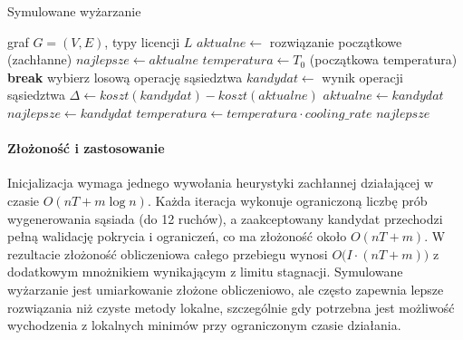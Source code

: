 \begin{algorithm}[H]
  \caption{Symulowane wyżarzanie}
  \label{alg:sa}
  \begin{algorithmic}[1]
    \Require graf $G=(V,E)$, typy licencji $ L$
    \State $aktualne \gets$ rozwiązanie początkowe (zachłanne)
    \State $najlepsze \gets aktualne$
    \State $temperatura \gets T_0$ (początkowa temperatura)
     \textbf{break} \EndIf
    \State wybierz losową operację sąsiedztwa
    \State $kandydat \gets$ wynik operacji sąsiedztwa
    \State $\Delta \gets koszt(kandydat) - koszt(aktualne)$
    \State $aktualne \gets kandydat$
    \State $najlepsze \gets kandydat$
    \EndIf
    \EndIf
    \State $temperatura \gets temperatura \cdot cooling\_rate$
    \EndFor
    \State \Return $najlepsze$
  \end{algorithmic}
\end{algorithm}

\paragraph{Złożoność i zastosowanie}
Inicjalizacja wymaga jednego wywołania heurystyki zachłannej działającej w czasie $O(nT + m\log n)$. Każda iteracja wykonuje ograniczoną liczbę prób wygenerowania sąsiada (do 12 ruchów), a zaakceptowany kandydat przechodzi pełną walidację pokrycia i ograniczeń, co ma złożoność około $O(nT + m)$. W rezultacie złożoność obliczeniowa całego przebiegu wynosi $O\bigl(I \cdot (nT + m)\bigr)$ z dodatkowym mnożnikiem wynikającym z limitu stagnacji. Symulowane wyżarzanie jest umiarkowanie złożone obliczeniowo, ale często zapewnia lepsze rozwiązania niż czyste metody lokalne, szczególnie gdy potrzebna jest możliwość wychodzenia z lokalnych minimów przy ograniczonym czasie działania.
